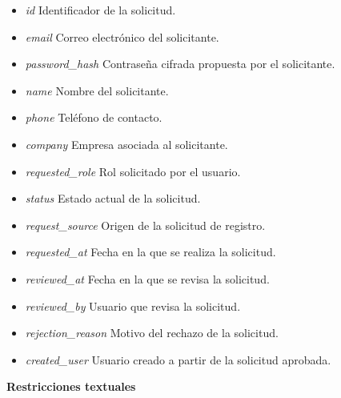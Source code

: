 \begin{itemize}

      \item \textit{id}
            Identificador de la solicitud.
      \item \textit{email}
            Correo electrónico del solicitante.
      \item \textit{password\_hash}
            Contraseña cifrada propuesta por el solicitante.
      \item \textit{name}
            Nombre del solicitante.
      \item \textit{phone}
            Teléfono de contacto.
      \item \textit{company}
            Empresa asociada al solicitante.
      \item \textit{requested\_role}
            Rol solicitado por el usuario.
      \item \textit{status}
            Estado actual de la solicitud.
      \item \textit{request\_source}
            Origen de la solicitud de registro.
      \item \textit{requested\_at}
            Fecha en la que se realiza la solicitud.
      \item \textit{reviewed\_at}
            Fecha en la que se revisa la solicitud.
      \item \textit{reviewed\_by}
            Usuario que revisa la solicitud.
      \item \textit{rejection\_reason}
            Motivo del rechazo de la solicitud.
      \item \textit{created\_user}
            Usuario creado a partir de la solicitud aprobada.

\end{itemize}

\textbf{Restricciones textuales}

